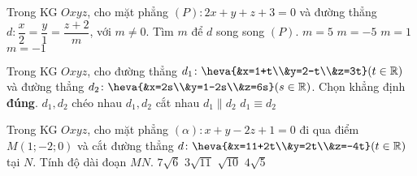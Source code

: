 	\begin{ex}%
	Trong KG $Oxyz$, cho mặt phẳng $(P) \colon 2x+y+z+3=0$ và đường thẳng $d: \dfrac{x}{2}=\dfrac{y}{1}=\dfrac{z+2}{m}$, với $m\neq 0$. Tìm $m$ để $d$ song song $(P)$.
	\choice
	{$m=5 $}
	{\True $m=-5 $}
	{$m=1 $}
	{$m=-1 $}
	\end{ex}
	\begin{ex}%
	Trong KG $Oxyz$, cho đường thẳng $d_1\colon \heva{&x=1+t\\&y=2-t\\&z=3t}(t\in \mathbb{R})$ và đường thẳng $d_2\colon \heva{&x=2s\\&y=1-2s\\&z=6s}(s\in \mathbb{R})$. Chọn khẳng định \textbf{đúng}.
	\choice
	{$d_1,d_2$ chéo nhau}
	{$d_1,d_2$ cắt nhau}
	{\True $d_1\parallel d_2$}
	{$d_1\equiv d_2$}
	\end{ex}
	\begin{ex}%
	Trong KG $Oxyz$, cho mặt phẳng $(\alpha)\colon x+y-2z+1=0$ đi qua điểm $M(1;-2;0)$ và cắt đường thẳng $d\colon \heva{&x=11+2t\\&y=2t\\&z=-4t} (t\in \mathbb{R})$ tại $N$. Tính độ dài đoạn $MN$.
	\choice
	{$7\sqrt{6}$}
	{$3\sqrt{11}$}
	{$\sqrt{10}$}
	{\True $4\sqrt{5}$}
	\end{ex}
